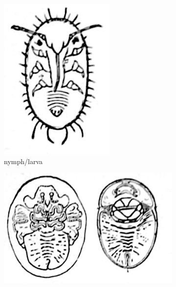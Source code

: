\documentclass[letterpaper, 11pt]{article}
\begin{document}
\begin{figure}[ht!]
 \centering
 \begin{subfigure}[ht!]{0.12\textwidth}
  \includegraphics[width=\textwidth]{aleyrodid1.png}
  \caption{nymph/larva}
  \label{fig:aleyrodid1}
 \end{subfigure}
 \hfill
 \begin{subfigure}[ht!]{0.3\textwidth}
  \includegraphics[width=\textwidth]{aleyrodid2.png}

\end{subfigure}
\end{figure}
\end{document}
